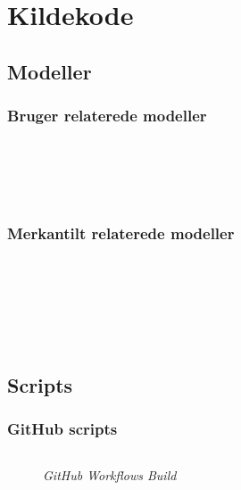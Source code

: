 \chapter{Kildekode}
\label{appendix:sourcecode}

\section{Modeller}

\subsection{Bruger relaterede modeller}
\label{subsection:user-model}

\inputminted{csharp}{codefiles/models/ApplicationUser.cs}
\label{minted:application-user}

\inputminted{csharp}{codefiles/models/Customer.cs}
\label{minted:customer}

\inputminted{csharp}{codefiles/models/Employee.cs}
\label{minted:employee}

\inputminted{csharp}{codefiles/models/Guest.cs}
\label{minted:guest}

\inputminted{csharp}{codefiles/models/Address.cs}
\label{minted:address}

\inputminted{csharp}{codefiles/models/Company.cs}
\label{minted:company}

\subsection{Merkantilt relaterede modeller}
\label{appendix:mercantile-model}

\inputminted{csharp}{codefiles/models/Product.cs}
\label{minted:product}

\inputminted{csharp}{codefiles/models/Tag.cs}
\label{minted:tag}

\inputminted{csharp}{codefiles/models/Order.cs}
\label{minted:order}

\inputminted{csharp}{codefiles/models/OrderItem.cs}
\label{minted:order-item}

\inputminted{csharp}{codefiles/models/SpecialOrderInstruction.cs}
\label{minted:special-order-instruction}

\inputminted{csharp}{codefiles/models/Basket.cs}
\label{minted:basket}

\inputminted{csharp}{codefiles/models/BasketItem.cs}
\label{minted:basket-item}

\inputminted{csharp}{codefiles/models/BasketActivity.cs}
\label{minted:basketactivity}

\section{Scripts}

\subsection{GitHub scripts}
\label{appendix:github-scripts}
\begin{figure}
    \inputminted{yaml}{codefiles/build.yml}
    \caption{\emph{GitHub Workflows Build}}
    \label{minted:build-yml}
\end{figure}